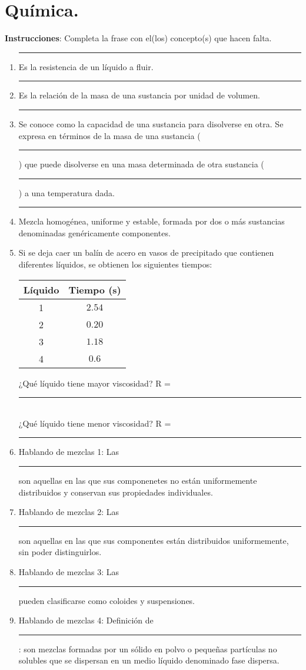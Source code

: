 \documentclass[12pt]{exam}
\begin{document}
\newpage

\section{Química.}

\textbf{Instrucciones}: Completa la frase con el(los) concepto(s) que hacen falta.

\begin{enumerate}
\item \rule{3cm}{0.1mm} Es la resistencia de un líquido a fluir.
\item \rule{3cm}{0.1mm} Es la relación de la masa de una sustancia por unidad de volumen.
\item \rule{3cm}{0.1mm} Se conoce como la capacidad de una sustancia para disolverse en otra. Se expresa en términos de la masa de una sustancia (\rule{3cm}{0.1mm}) que puede disolverse en una masa determinada de otra sustancia (\rule{3cm}{0.1mm}) a una temperatura dada.
\item \rule{3cm}{0.1mm} Mezcla homogénea, uniforme y estable, formada por dos o más sustancias denominadas genéricamente componentes.
\item Si se deja caer un balín de acero en vasos de precipitado que contienen diferentes líquidos, se obtienen los siguientes tiempos:
\begin{table}[H]
    \centering
    \begin{tabular}{c | c }
        Líquido & Tiempo (s) \\ \hline
        1 & $\num{2.54}$ \\ \hline
        2 & $\num{0.20}$ \\ \hline
        3 & $\num{1.18}$ \\ \hline
        4 & $\num{0.6}$ \\ \hline
    \end{tabular}
\end{table}
¿Qué líquido tiene mayor viscosidad? R = \rule{2cm}{0.1mm} \\
¿Qué líquido tiene menor viscosidad? R = \rule{2cm}{0.1mm}
\item Hablando de mezclas 1: Las \rule{3cm}{0.1mm} son aquellas en las que sus componenetes no están uniformemente distribuidos y conservan sus propiedades individuales.
\item Hablando de mezclas 2: Las \rule{3cm}{0.1mm} son aquellas en las que sus componentes están distribuidos uniformemente, sin poder distinguirlos.
\item Hablando de mezclas 3: Las \rule{3cm}{0.1mm} pueden clasificarse como coloides y suspensiones.
\item Hablando de mezclas 4: Definición de \rule{3cm}{0.1mm} : son mezclas formadas por un sólido en polvo o pequeñas partículas no solubles que se dispersan en un medio líquido denominado fase dispersa.
\end{enumerate}
\end{document}
